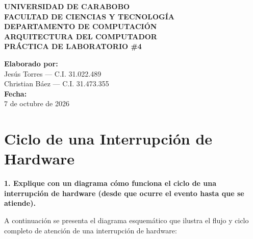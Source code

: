 \documentclass[12pt,a4paper]{article}
\begin{document}
\begin{titlepage}
    \centering
    {\large \textbf{UNIVERSIDAD DE CARABOBO}}\\[0.2cm]
    {\large \textbf{FACULTAD DE CIENCIAS Y TECNOLOGÍA}}\\[0.2cm]
    {\large \textbf{DEPARTAMENTO DE COMPUTACIÓN}}\\[0.2cm]
    {\large \textbf{ARQUITECTURA DEL COMPUTADOR}}\\[2.5cm]

    {\Huge \textbf{PRÁCTICA DE LABORATORIO \#4}}\\[4cm]

    \begin{flushright}
    {\large \textbf{Elaborado por:}}\\[0.3cm]
    Jesús Torres --- C.I. 31.022.489\\[0.2cm]
    Christian Báez --- C.I. 31.473.355\\[1.5cm]

    {\large \textbf{Fecha:}}\\[0.3cm]
    7 de octubre de 2026
    \end{flushright}
\end{titlepage}

\newpage
\tableofcontents
\newpage


\section{Ciclo de una Interrupción de Hardware} 
\textbf{1. Explique con un diagrama cómo funciona el ciclo de una interrupción de hardware (desde que ocurre el evento hasta que se atiende).} 

A continuación se presenta el diagrama esquemático que ilustra el flujo y ciclo completo de atención de una interrupción de hardware:
\end{document}
